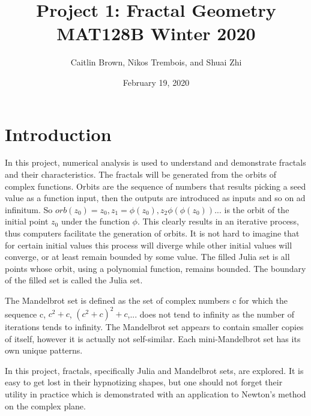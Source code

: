 \documentclass[letterpaper,11pt]{article}
\begin{document}
\title{Project 1: Fractal Geometry \\ 
		\large MAT128B Winter 2020}
\author{Caitlin Brown, Nikos Trembois, and Shuai Zhi}
\date{February 19, 2020}
\maketitle
\tableofcontents
\newpage

\section*{Introduction}
In this project, numerical analysis is used to understand and demonstrate fractals and their characteristics. The fractals will be generated from the orbits of complex functions. Orbits are the sequence of numbers that results picking a seed value as a function input, then the outputs are introduced as inputs and so on ad infinitum. So $orb(z_0) = z_0, z_1 = \phi(z_0), z_2 \phi(\phi(z_0)) ...$ is the orbit of the initial point $z_0$ under the function $\phi$. This clearly results in an iterative process, thus computers facilitate the generation of orbits. It is not hard to imagine that for certain initial values this process will diverge while other initial values will converge, or at least remain bounded by some value. The filled Julia set is all points whose orbit, using a polynomial function, remains bounded. The boundary of the filled set is called the Julia set.

The Mandelbrot set is defined as the set of complex numbers c for which the sequence c, $c^2 +c$, $(c^2 + c)^2 +c$,... does not tend to infinity as the number of iterations tends to infinity. The Mandelbrot set appears to contain smaller copies of itself, however it is actually not self-similar. Each mini-Mandelbrot set has its own unique patterns.

In this project, fractals, specifically Julia and Mandelbrot sets, are explored. It is easy to get lost in their hypnotizing shapes, but one should not forget their utility in practice which is demonstrated with an application to Newton's method on the complex plane. 
\end{document}
